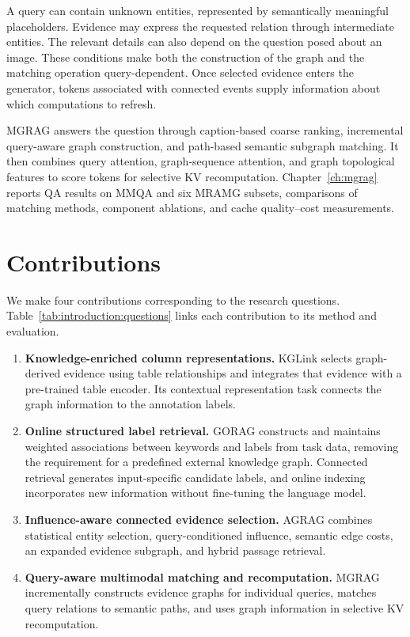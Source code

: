 A query can contain unknown entities, represented by semantically meaningful placeholders. Evidence may express the requested relation through intermediate entities. The relevant details can also depend on the question posed about an image. These conditions make both the construction of the graph and the matching operation query-dependent. Once selected evidence enters the generator, tokens associated with connected events supply information about which computations to refresh.

MGRAG answers the question through caption-based coarse ranking, incremental query-aware graph construction, and path-based semantic subgraph matching. It then combines query attention, graph-sequence attention, and graph topological features to score tokens for selective KV recomputation. Chapter~\ref{ch:mgrag} reports QA results on MMQA and six MRAMG subsets, comparisons of matching methods, component ablations, and cache quality--cost measurements.

\section{Contributions}
\label{sec:introduction:contributions}
We make four contributions corresponding to the research questions. Table~\ref{tab:introduction:questions} links each contribution to its method and evaluation.

\begin{enumerate}
\item \textbf{Knowledge-enriched column representations.} KGLink selects graph-derived evidence using table relationships and integrates that evidence with a pre-trained table encoder. Its contextual representation task connects the graph information to the annotation labels.
\item \textbf{Online structured label retrieval.} GORAG constructs and maintains weighted associations between keywords and labels from task data, removing the requirement for a predefined external knowledge graph. Connected retrieval generates input-specific candidate labels, and online indexing incorporates new information without fine-tuning the language model.
\item \textbf{Influence-aware connected evidence selection.} AGRAG combines statistical entity selection, query-conditioned influence, semantic edge costs, an expanded evidence subgraph, and hybrid passage retrieval.
\item \textbf{Query-aware multimodal matching and recomputation.} MGRAG incrementally constructs evidence graphs for individual queries, matches query relations to semantic paths, and uses graph information in selective KV recomputation.
\end{enumerate}


